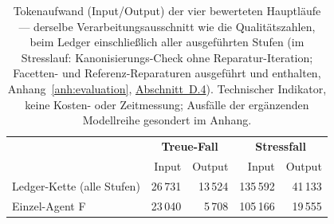 
\begin{table}[htbp]
  \centering
  \small
  \begin{tabular}{lrrrr}
    \hline
    & \multicolumn{2}{c}{\textbf{Treue-Fall}} & \multicolumn{2}{c}{\textbf{Stressfall}} \\
    & Input & Output & Input & Output \\
    \hline
    Ledger-Kette (alle Stufen) & 26\,731 & 13\,524 & 135\,592 & 41\,133 \\
    Einzel-Agent F & 23\,040 & 5\,708 & 105\,166 & 19\,555 \\
    \hline
  \end{tabular}
  \caption[Tokenaufwand der vier bewerteten Hauptläufe]{Tokenaufwand (Input/Output) der vier bewerteten
    Hauptläufe --- derselbe Verarbeitungsausschnitt wie die
    Qualitätszahlen, beim Ledger einschließlich aller ausgeführten
    Stufen (im Stresslauf: Kanonisierungs-Check ohne
    Reparatur-Iteration; Facetten- und Referenz-Reparaturen
    ausgeführt und enthalten, Anhang~\ref{anh:evaluation}, \hyperref[anh:pruefartefakte]{Abschnitt~D.4}). Technischer
    Indikator, keine Kosten- oder Zeitmessung; Ausfälle der
    ergänzenden Modellreihe gesondert im Anhang.}
  \label{t:eval-aufwand}
\end{table}
